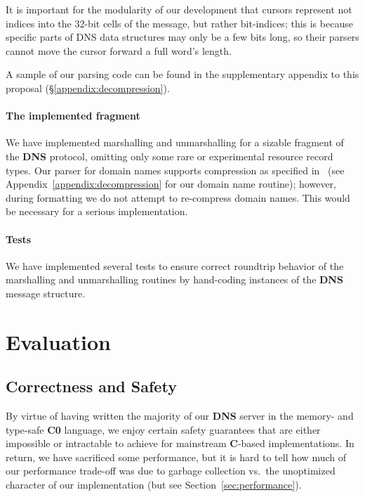 \documentclass{article}
\newcommand\Kwd[1]{{\sffamily\bfseries{#1}}}
\begin{document}
It is important for the modularity of our development that cursors
represent not indices into the 32-bit cells of the message, but rather
bit-indices; this is because specific parts of DNS data structures may
only be a few bits long, so their parsers cannot move the cursor
forward a full word's length.

A sample of our parsing code can be found in the supplementary
appendix to this proposal (\S\ref{appendix:decompression}).

\paragraph{The implemented fragment}

We have implemented marshalling and unmarshalling for a sizable
fragment of the \Kwd{DNS} protocol, omitting only some rare or
experimental resource record types. Our parser for domain names
supports compression as specified in~\cite{rfc:1035} (see
Appendix~\ref{appendix:decompression} for our domain name routine);
however, during formatting we do not attempt to re-compress domain
names. This would be necessary for a serious implementation.

\paragraph{Tests}

We have implemented several tests to ensure correct roundtrip behavior
of the marshalling and unmarshalling routines by hand-coding instances
of the \Kwd{DNS} message structure.

\section{Evaluation}

\subsection{Correctness and Safety}

By virtue of having written the majority of our \Kwd{DNS} server in
the memory- and type-safe \Kwd{C0} language, we enjoy certain safety
guarantees that are either impossible or intractable to achieve for
mainstream \Kwd{C}-based implementations. In return, we have sacrificed
some performance, but it is hard to tell how much of our performance
trade-off was due to garbage collection vs.\ the unoptimized character of
our implementation (but see Section~\ref{sec:performance}).
\end{document}
